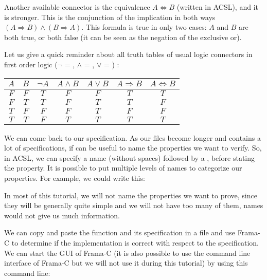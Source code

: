 Another available connector is the equivalence $A \Leftrightarrow B$
(written  in ACSL), and it is
stronger. This is the conjunction of the implication in both ways
$(A \Rightarrow B) \wedge (B \Rightarrow A)$. This formula is true in
only two cases: $A$ and $B$ are both true, or both false (it can be seen
as the negation of the exclusive or).



\begin{Information}
  Let us give a quick reminder about all
  truth tables of usual logic connectors in first order logic
  ($\neg$ = \CodeInline{!}, $\wedge$ = \CodeInline{\&\&}, $\vee$ = \CodeInline{||}) :

\begin{longtabu}{|c|c|c|c|c|c|c|} \hline
$A$ & $B$ & $\neg A$ & $A \wedge B$ & $A \vee B$ & $A \Rightarrow B$ & $A \Leftrightarrow B$ \\ \hline
$F$ & $F$ & $T$ & $F$ & $F$ & $T$ & $T$ \\ \hline
$F$ & $T$ & $T$ & $F$ & $T$ & $T$ & $F$ \\ \hline
$T$ & $F$ & $F$ & $F$ & $T$ & $F$ & $F$ \\ \hline
$T$ & $T$ & $F$ & $T$ & $T$ & $T$ & $T$ \\ \hline
\end{longtabu}
\end{Information}


We can come back to our specification. As our files become longer and
contains a lot of specifications, if can be useful to name the
properties we want to verify. So, in ACSL, we can specify a name
(without spaces) followed by a \CodeInline{:}, before stating the property.
It is possible to put multiple levels of names to categorize our
properties. For example, we could write this:






In most of this tutorial, we will not name the properties we want to
prove, since they will be generally quite simple and we will not have
too many of them, names would not give us much information.

We can copy and paste the function  and its specification in
a file  and use Frama-C to determine if the implementation
is correct with respect to the specification. We can start the GUI of Frama-C
(it is also possible to use the command line interface of Frama-C but we
will not use it during this tutorial) by using this command line:



